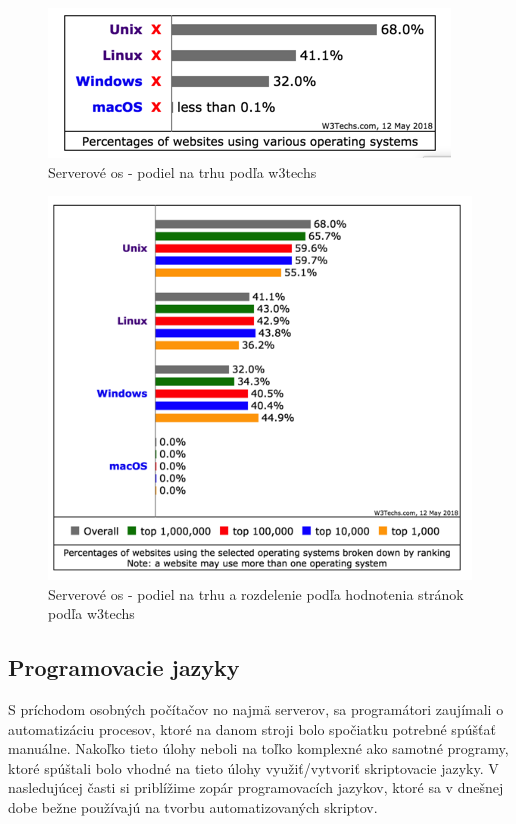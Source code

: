 \begin{figure}[!htbp]
	\centering
	\includegraphics[scale=0.4]{img/usg_server.png}
	\caption{Serverové \acrshort{os} - podiel na trhu podľa w3techs\cite{pop}}
	\label{fig:test}
	
\end{figure}
\begin{figure}[!htbp]
	\centering
	\includegraphics[scale=0.4]{img/usage_grou_by_os_sites.png}
	\caption{Serverové \acrshort{os} - podiel na trhu a rozdelenie podľa hodnotenia stránok podľa w3techs\cite{pop}}
	\label{fig:test}
	
\end{figure}

\subsection{Programovacie jazyky}
\indent S príchodom osobných počítačov no najmä serverov, sa programátori zaujímali o automatizáciu procesov, ktoré na danom stroji bolo spočiatku potrebné spúšťať manuálne. Nakoľko tieto úlohy neboli na toľko komplexné ako samotné programy, ktoré spúštali bolo vhodné na tieto úlohy využiť/vytvoriť skriptovacie jazyky. V nasledujúcej časti si priblížime zopár programovacích jazykov, ktoré sa v dnešnej dobe bežne používajú na tvorbu automatizovaných skriptov.

